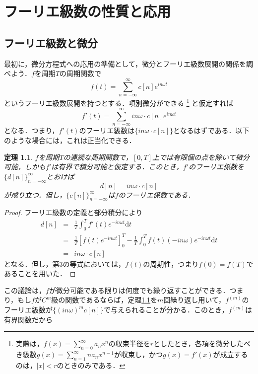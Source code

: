 \documentclass[a4j]{jsbook}
\newtheorem{theorem}{定理}
\numberwithin{theorem}{chapter}  %
\begin{document}
\chapter{フーリエ級数の性質と応用} \label{chap2}
\section{フーリエ級数と微分} \label{sec2-1}
最初に，微分方程式への応用の準備として，微分とフーリエ級数展開の関係を調べよう．\(f\)を周期\(T\)の周期関数で
\begin{equation*}
    f(t)=\sum_{n=-\infty}^\infty c[n]e^{in\omega t}
\end{equation*}
というフーリエ級数展開を持つとする．項別微分ができる
\footnote{実際は，\(\displaystyle f(x)=\sum_{n=0}^\infty a_nx^n\)の収束半径を\(r\)としたとき，各項を微分したべき級数\(\displaystyle g(x)=\sum_{n=1}^\infty na_nx^{n-1}\)が収束し，かつ\(g(x)=f'(x)\)が成立するのは，\(|x|<r\)のときのみである．
}
と仮定すれば
\begin{equation*}
    f'(t)=\sum_{n=-\infty}^\infty in\omega\cdot c[n]e^{in\omega t}
\end{equation*}
となる．つまり，\(f'(t)\)のフーリエ級数は\(\{in\omega\cdot c[n]\}\)となるはずである．以下のような場合には，これは正当化できる．
\begin{theorem}
\label{th2-1}
\(f\)を周期\(T\)の連続な周期関数で，\([0, T]\)上では有限個の点を除いて微分可能，しかも\(f'\)は有界で積分可能と仮定する．このとき，\(f'\)のフーリエ係数を\(\{d[n]\}_{n=-\infty}^\infty\)とおけば
\begin{equation*}
    d[n]=in\omega\cdot c[n]
\end{equation*}
が成り立つ．但し，\(\{c[n]\}_{n=-\infty}^\infty\)は\(f\)のフーリエ係数である．
\end{theorem}
\begin{proof}
フーリエ級数の定義と部分積分により
\begin{eqnarray*}
d[n]&=&\frac{1}{T}\int_0^T f'(t)e^{-in\omega t}\mathrm{d}t \\
&=&\frac{1}{T}\left[f(t)e^{-in\omega t}\right]_0^T-\frac{1}{T}\int_0^T f(t)(-in\omega)e^{-in\omega t}\mathrm{d}t \\
&=&in\omega\cdot c[n]
\end{eqnarray*}
となる．但し，第3の等式においては，\(f(t)\)の周期性，つまり\(f(0)=f(T)\)であることを用いた．
\end{proof}
この議論は，\(f\)が微分可能である限りは何度でも繰り返すことができる．つまり，もし\(f\)が\(C^m\)級の関数であるならば，定理\ref{th2-1}を\(m\)回繰り返し用いて，\(f^{(m)}\)のフーリエ級数が\(\{(in\omega)^mc[n]\}\)で与えられることが分かる．このとき，\(f^{(m)}\)は有界関数だから
\end{document}
